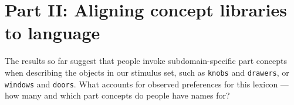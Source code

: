 \documentclass[10pt,letterpaper]{article}
\begin{document}




\section{Part II: Aligning concept libraries \\ to language}\label{sec-part-ii}
The results so far suggest that people invoke subdomain-specific part concepts when describing the objects in our stimulus set, such as \texttt{knobs} and \texttt{drawers}, or \texttt{windows} and \texttt{doors}.
What accounts for observed preferences for this lexicon --- how many and which part concepts do people have names for?
\end{document}
